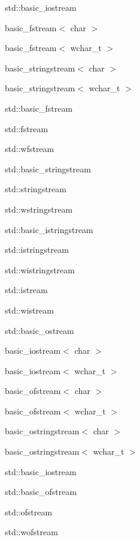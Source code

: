 \begin{DoxyCompactList}
\begin{DoxyCompactList}
\begin{DoxyCompactList}
\begin{DoxyCompactList}
\item std\+:\+:basic\+\_\+iostream\begin{DoxyCompactList}
\item basic\+\_\+fstream$<$ char $>$\item basic\+\_\+fstream$<$ wchar\+\_\+t $>$\item basic\+\_\+stringstream$<$ char $>$\item basic\+\_\+stringstream$<$ wchar\+\_\+t $>$\item std\+:\+:basic\+\_\+fstream\begin{DoxyCompactList}
\item std\+:\+:fstream\item std\+:\+:wfstream\end{DoxyCompactList}
\item std\+:\+:basic\+\_\+stringstream\begin{DoxyCompactList}
\item std\+:\+:stringstream\item std\+:\+:wstringstream\end{DoxyCompactList}
\end{DoxyCompactList}
\item std\+:\+:basic\+\_\+istringstream\begin{DoxyCompactList}
\item std\+:\+:istringstream\item std\+:\+:wistringstream\end{DoxyCompactList}
\item std\+:\+:istream\item std\+:\+:wistream\end{DoxyCompactList}
\item std\+:\+:basic\+\_\+ostream\begin{DoxyCompactList}
\item basic\+\_\+iostream$<$ char $>$\item basic\+\_\+iostream$<$ wchar\+\_\+t $>$\item basic\+\_\+ofstream$<$ char $>$\item basic\+\_\+ofstream$<$ wchar\+\_\+t $>$\item basic\+\_\+ostringstream$<$ char $>$\item basic\+\_\+ostringstream$<$ wchar\+\_\+t $>$\item std\+:\+:basic\+\_\+iostream\item std\+:\+:basic\+\_\+ofstream\begin{DoxyCompactList}
\item std\+:\+:ofstream\item std\+:\+:wofstream\end{DoxyCompactList}

\end{DoxyCompactList}
\end{DoxyCompactList}
\end{DoxyCompactList}
\end{DoxyCompactList}
